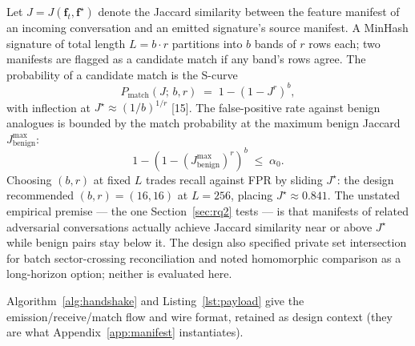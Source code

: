 \documentclass[11pt]{article}
\begin{document}
Let $J = J(\mathbf{f}_t, \mathbf{f}^\star)$ denote the Jaccard similarity between the feature manifest of an incoming conversation and an emitted signature's source manifest. A MinHash signature of total length $L = b \cdot r$ partitions into $b$ bands of $r$ rows each; two manifests are flagged as a candidate match if any band's rows agree. The probability of a candidate match is the S-curve
\begin{equation}
P_{\text{match}}(J;\, b, r) \;=\; 1 - (1 - J^{r})^{b},
\label{eq:lsh-banded}
\end{equation}
with inflection at $J^\star \approx (1/b)^{1/r}$ [15]. The false-positive rate against benign analogues is bounded by the match probability at the maximum benign Jaccard $J_{\text{benign}}^{\max}$:
\begin{equation}
1 - \left(1 - (J_{\text{benign}}^{\max})^{r}\right)^{b} \;\leq\; \alpha_0.
\label{eq:fpr-banded}
\end{equation}
Choosing $(b, r)$ at fixed $L$ trades recall against FPR by sliding $J^\star$: the design recommended $(b, r) = (16, 16)$ at $L = 256$, placing $J^\star \approx 0.841$. The unstated empirical premise --- the one Section~\ref{sec:rq2} tests --- is that manifests of related adversarial conversations actually achieve Jaccard similarity near or above $J^\star$ while benign pairs stay below it. The design also specified private set intersection for batch sector-crossing reconciliation and noted homomorphic comparison as a long-horizon option; neither is evaluated here.

Algorithm~\ref{alg:handshake} and Listing~\ref{lst:payload} give the emission/receive/match flow and wire format, retained as design context (they are what Appendix~\ref{app:manifest} instantiates).
\end{document}
